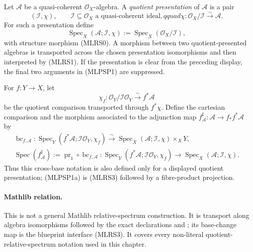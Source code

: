 \begin{definition}
  \label{def:nagata-presented-relative-spec}

  Let $\mathcal A$ be a quasi-coherent $\mathcal O_X$-algebra.  A
  \emph{quotient presentation} of $\mathcal A$ is a pair
  \[
    (\mathcal I,\chi),\qquad
    \mathcal I\subseteq\mathcal O_X\text{ a quasi-coherent ideal},qquad
    \chi\colon\mathcal O_X/\mathcal I\xrightarrow{\sim}\mathcal A.
                                                                    \tag{MLPSP0}
  \]
  For such a presentation define
  \[
    \operatorname{Spec}_X(\mathcal A;\mathcal I,\chi)
      :=\operatorname{Spec}_X(\mathcal O_X/\mathcal I),           \tag{MLPSP1}
  \]
  with structure morphism (MLRS0).  A morphism between two
  quotient-presented algebras is transported across the chosen presentation
  isomorphisms and then interpreted by (MLRS1).  If the presentation is
  clear from the preceding display, the final two arguments in (MLPSP1) are
  suppressed.

  For $f\colon Y\to X$, let
  \[
    \chi_f\colon
      \mathcal O_Y/\mathcal I\mathcal O_Y
        \xrightarrow{\sim}f^*\mathcal A
  \]
  be the quotient comparison transported through $f^*\chi$.  Define the
  cartesian comparison and the morphism associated to the adjunction map
  $f^\sharp_{\mathcal A}\colon\mathcal A\to f_*f^*\mathcal A$ by
  \[
  \begin{gathered}
    \operatorname{bc}_{f,\mathcal A}\colon
      \operatorname{Spec}_Y
        (f^*\mathcal A;\mathcal I\mathcal O_Y,\chi_f)
        \xrightarrow{\sim}
      \operatorname{Spec}_X(\mathcal A;\mathcal I,\chi)\times_XY,\\
    \operatorname{Spec}(f^\sharp_{\mathcal A})
      :=\operatorname{pr}_1\circ\operatorname{bc}_{f,\mathcal A}\colon
      \operatorname{Spec}_Y
        (f^*\mathcal A;\mathcal I\mathcal O_Y,\chi_f)
        \longrightarrow
      \operatorname{Spec}_X(\mathcal A;\mathcal I,\chi).
                                                                    \tag{MLPSP1a}
  \end{gathered}
  \]
  Thus this cross-base notation is also defined only for a displayed
  quotient presentation; (MLPSP1a) is (MLRS3) followed by a fibre-product
  projection.

  \paragraph{Mathlib relation.}
  This is not a general Mathlib relative-spectrum construction.  It is
  transport along algebra isomorphisms followed by the exact declarations
  \texttt{} and
  \texttt{}; its base-change
  map is the blueprint interface (MLRS3).  It covers every non-literal
  quotient-relative-spectrum notation used in this chapter.
\end{definition}

